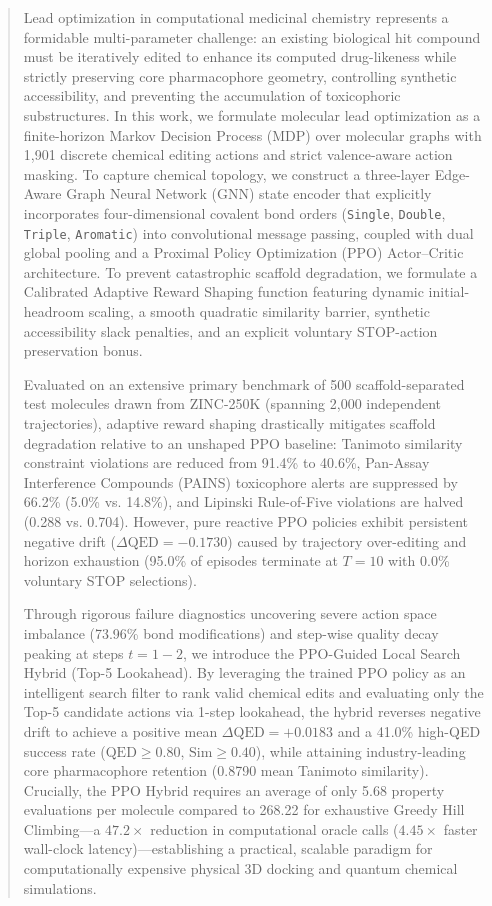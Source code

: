 \documentclass{ieeeaccess}
\begin{document}
\begin{abstract}
Lead optimization in computational medicinal chemistry represents a formidable multi-parameter challenge: an existing biological hit compound must be iteratively edited to enhance its computed drug-likeness while strictly preserving core pharmacophore geometry, controlling synthetic accessibility, and preventing the accumulation of toxicophoric substructures. In this work, we formulate molecular lead optimization as a finite-horizon Markov Decision Process (MDP) over molecular graphs with 1,901 discrete chemical editing actions and strict valence-aware action masking. To capture chemical topology, we construct a three-layer Edge-Aware Graph Neural Network (GNN) state encoder that explicitly incorporates four-dimensional covalent bond orders (\texttt{Single}, \texttt{Double}, \texttt{Triple}, \texttt{Aromatic}) into convolutional message passing, coupled with dual global pooling and a Proximal Policy Optimization (PPO) Actor--Critic architecture. To prevent catastrophic scaffold degradation, we formulate a Calibrated Adaptive Reward Shaping function featuring dynamic initial-headroom scaling, a smooth quadratic similarity barrier, synthetic accessibility slack penalties, and an explicit voluntary STOP-action preservation bonus.

Evaluated on an extensive primary benchmark of 500 scaffold-separated test molecules drawn from ZINC-250K (spanning 2,000 independent trajectories), adaptive reward shaping drastically mitigates scaffold degradation relative to an unshaped PPO baseline: Tanimoto similarity constraint violations are reduced from 91.4\% to 40.6\%, Pan-Assay Interference Compounds (PAINS) toxicophore alerts are suppressed by 66.2\% (5.0\% vs. 14.8\%), and Lipinski Rule-of-Five violations are halved (0.288 vs. 0.704). However, pure reactive PPO policies exhibit persistent negative drift ($\Delta\text{QED} = -0.1730$) caused by trajectory over-editing and horizon exhaustion (95.0\% of episodes terminate at $T=10$ with 0.0\% voluntary STOP selections).

Through rigorous failure diagnostics uncovering severe action space imbalance (73.96\% bond modifications) and step-wise quality decay peaking at steps $t=1-2$, we introduce the PPO-Guided Local Search Hybrid (Top-5 Lookahead). By leveraging the trained PPO policy as an intelligent search filter to rank valid chemical edits and evaluating only the Top-5 candidate actions via 1-step lookahead, the hybrid reverses negative drift to achieve a positive mean $\Delta\text{QED} = +0.0183$ and a 41.0\% high-QED success rate ($\text{QED} \ge 0.80$, $\text{Sim} \ge 0.40$), while attaining industry-leading core pharmacophore retention (0.8790 mean Tanimoto similarity). Crucially, the PPO Hybrid requires an average of only 5.68 property evaluations per molecule compared to 268.22 for exhaustive Greedy Hill Climbing---a $47.2\times$ reduction in computational oracle calls ($4.45\times$ faster wall-clock latency)---establishing a practical, scalable paradigm for computationally expensive physical 3D docking and quantum chemical simulations.
\end{abstract}
\end{document}
